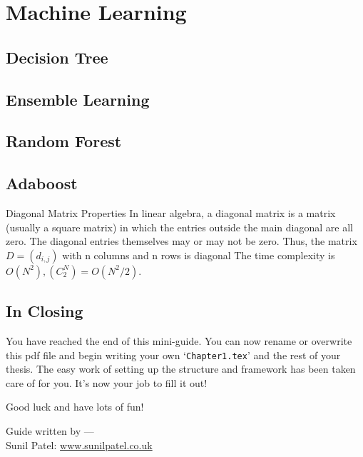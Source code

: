 \chapter{Machine Learning} %

\label{Chapter4} %


\section{Decision Tree}
\section{Ensemble Learning}
\section{Random Forest}
\section{Adaboost}

\begin{compactitem}

\item Diagonal Matrix Properties
In linear algebra, a diagonal matrix is a matrix (usually a square matrix) in which 
the entries outside the main diagonal are all zero. The diagonal entries themselves 
may or may not be zero. Thus, the matrix $D = (d_{i,j})$ with n columns and n rows is diagonal 
The time complexity is $O(N^2),  (C_2^N) = O(N^2/2)$.
\end{compactitem}


\section{In Closing}

You have reached the end of this mini-guide. You can now rename or overwrite this pdf file and begin writing your own `\texttt{Chapter1.tex}' and the rest of your thesis. The easy work of setting up the structure and framework has been taken care of for you. It's now your job to fill it out!

Good luck and have lots of fun!

\begin{flushright}
Guide written by ---\\
Sunil Patel: \href{http://www.sunilpatel.co.uk}{www.sunilpatel.co.uk}
\end{flushright}
